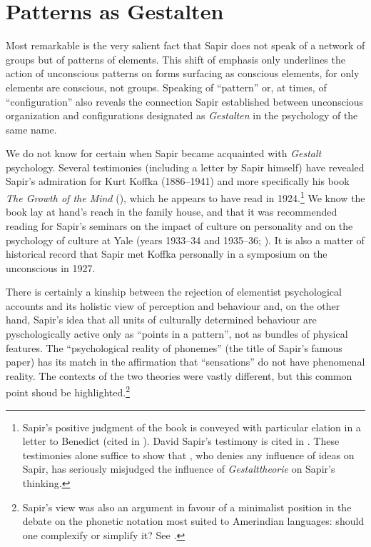 \documentclass[output=paper]{langscibook}
\begin{document}
\section{Patterns as Gestalten}
\label{sec:fortis:patternsgestalten}

Most remarkable is the very salient fact that Sapir does not speak of a network of groups but of patterns of elements. This shift of emphasis only underlines the action of unconscious patterns on forms surfacing as conscious elements, for only elements are conscious, not groups. Speaking of ``pattern'' or, at times, of ``configuration'' also reveals the connection Sapir established between unconscious organization and configurations designated as \emph{Gestalten} in the psychology of the same name. 

We do not know for certain when Sapir became acquainted with \emph{Gestalt} psychology. Several testimonies (including a letter by Sapir himself) have revealed Sapir's admiration for Kurt Koffka (1886--1941) and more specifically his book \emph{The Growth of the Mind} (\citeyear{Koffka1924}), which he appears to have read in 1924.\footnote{Sapir's positive judgment of the book is conveyed with particular elation in a letter to Benedict (cited in \citealt[121]{Sapir2002}). David Sapir's testimony is cited in \citet[478]{Cowan1986}. These testimonies alone suffice to show that \citet{Murray1981}, who denies any influence of  ideas on Sapir, has seriously misjudged the influence of \emph{Gestalttheorie} on Sapir's thinking.} We know the book lay at hand's reach in the family house, and that it was recommended reading for Sapir's seminars on the impact of culture on personality and on the psychology of culture at Yale (years 1933--34 and 1935--36; \citealt[677]{Sapir19991933}). It is also a matter of historical record that Sapir met Koffka personally in a symposium on the unconscious in 1927. 

There is certainly a kinship between the  rejection of elementist psychological accounts and its holistic view of perception and behaviour and, on the other hand, Sapir's idea that all units of culturally determined behaviour are pyschologically active only as ``points in a pattern'', not as bundles of physical features. The ``psychological reality of phonemes'' (the title of Sapir's famous paper) has its match in the  affirmation that ``sensations'' do not have phenomenal reality. The contexts of the two theories were vastly different, but this common point shoud be highlighted.\footnote{Sapir's view was also an argument in favour of a minimalist position in the debate on the phonetic notation most suited to Amerindian languages: should one complexify or simplify it? See \citet[285]{Darnell1990}.}
\end{document}
